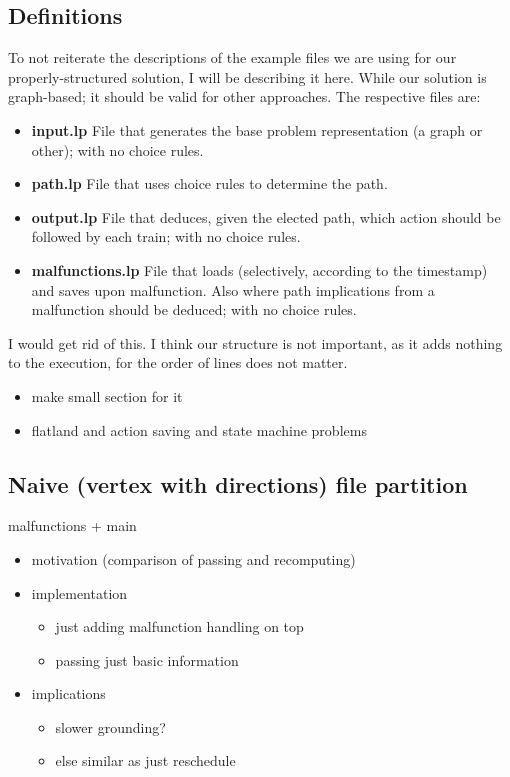 \documentclass{llncs}
\begin{document}
\subsection{Definitions}
To not reiterate the descriptions of the example files we are using for our properly-structured solution, I will be describing it here. While our solution is graph-based; it should be valid for other approaches. The respective files are:
\begin{itemize}
	\item  \textbf{input.lp} File that generates the base problem representation (a graph or other); with no choice rules.
	\item  \textbf{path.lp} File that uses choice rules to determine the path.
	\item  \textbf{output.lp} File that deduces, given the elected path, which action should be followed by each train; with no choice rules.
	\item  \textbf{malfunctions.lp} File that loads (selectively, according to the timestamp) and saves upon malfunction. Also where path implications from a malfunction should be deduced; with no choice rules.
\end{itemize}
\color{black} \color{gray} I would get rid of this. I think our structure is not important, as it adds nothing to the execution, for the order of lines does not matter. \color{black}
\color{blue}
\begin{itemize}
	\item make small section for it
	\item flatland and action saving and state machine problems
\end{itemize}
\color{black}



\subsection{Naive (vertex with directions) file partition}
malfunctions + main
\color{blue}
\begin{itemize}
	\item motivation (comparison of passing and recomputing)
	\item implementation
	\begin{itemize}
		\item just adding malfunction handling on top
		\item passing just basic information
	\end{itemize}
	\item implications
	\begin{itemize}
		\item slower grounding?
		\item else similar as just reschedule
	\end{itemize}
\end{itemize}
\color{black}
\end{document}
